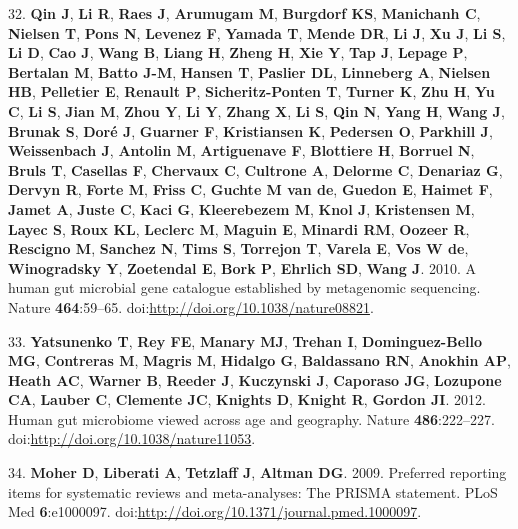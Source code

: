 \documentclass[12pt,]{article}
\begin{document}
32. \textbf{Qin J}, \textbf{Li R}, \textbf{Raes J}, \textbf{Arumugam M},
\textbf{Burgdorf KS}, \textbf{Manichanh C}, \textbf{Nielsen T},
\textbf{Pons N}, \textbf{Levenez F}, \textbf{Yamada T}, \textbf{Mende
DR}, \textbf{Li J}, \textbf{Xu J}, \textbf{Li S}, \textbf{Li D},
\textbf{Cao J}, \textbf{Wang B}, \textbf{Liang H}, \textbf{Zheng H},
\textbf{Xie Y}, \textbf{Tap J}, \textbf{Lepage P}, \textbf{Bertalan M},
\textbf{Batto J-M}, \textbf{Hansen T}, \textbf{Paslier DL},
\textbf{Linneberg A}, \textbf{Nielsen HB}, \textbf{Pelletier E},
\textbf{Renault P}, \textbf{Sicheritz-Ponten T}, \textbf{Turner K},
\textbf{Zhu H}, \textbf{Yu C}, \textbf{Li S}, \textbf{Jian M},
\textbf{Zhou Y}, \textbf{Li Y}, \textbf{Zhang X}, \textbf{Li S},
\textbf{Qin N}, \textbf{Yang H}, \textbf{Wang J}, \textbf{Brunak S},
\textbf{Doré J}, \textbf{Guarner F}, \textbf{Kristiansen K},
\textbf{Pedersen O}, \textbf{Parkhill J}, \textbf{Weissenbach J},
\textbf{Antolin M}, \textbf{Artiguenave F}, \textbf{Blottiere H},
\textbf{Borruel N}, \textbf{Bruls T}, \textbf{Casellas F},
\textbf{Chervaux C}, \textbf{Cultrone A}, \textbf{Delorme C},
\textbf{Denariaz G}, \textbf{Dervyn R}, \textbf{Forte M}, \textbf{Friss
C}, \textbf{Guchte M van de}, \textbf{Guedon E}, \textbf{Haimet F},
\textbf{Jamet A}, \textbf{Juste C}, \textbf{Kaci G}, \textbf{Kleerebezem
M}, \textbf{Knol J}, \textbf{Kristensen M}, \textbf{Layec S},
\textbf{Roux KL}, \textbf{Leclerc M}, \textbf{Maguin E}, \textbf{Minardi
RM}, \textbf{Oozeer R}, \textbf{Rescigno M}, \textbf{Sanchez N},
\textbf{Tims S}, \textbf{Torrejon T}, \textbf{Varela E}, \textbf{Vos W
de}, \textbf{Winogradsky Y}, \textbf{Zoetendal E}, \textbf{Bork P},
\textbf{Ehrlich SD}, \textbf{Wang J}. 2010. A human gut microbial gene
catalogue established by metagenomic sequencing. Nature
\textbf{464}:59--65. doi:\url{http://doi.org/10.1038/nature08821}.

33. \textbf{Yatsunenko T}, \textbf{Rey FE}, \textbf{Manary MJ},
\textbf{Trehan I}, \textbf{Dominguez-Bello MG}, \textbf{Contreras M},
\textbf{Magris M}, \textbf{Hidalgo G}, \textbf{Baldassano RN},
\textbf{Anokhin AP}, \textbf{Heath AC}, \textbf{Warner B},
\textbf{Reeder J}, \textbf{Kuczynski J}, \textbf{Caporaso JG},
\textbf{Lozupone CA}, \textbf{Lauber C}, \textbf{Clemente JC},
\textbf{Knights D}, \textbf{Knight R}, \textbf{Gordon JI}. 2012. Human
gut microbiome viewed across age and geography. Nature
\textbf{486}:222--227. doi:\url{http://doi.org/10.1038/nature11053}.

34. \textbf{Moher D}, \textbf{Liberati A}, \textbf{Tetzlaff J},
\textbf{Altman DG}. 2009. Preferred reporting items for systematic
reviews and meta-analyses: The PRISMA statement. PLoS Med
\textbf{6}:e1000097.
doi:\url{http://doi.org/10.1371/journal.pmed.1000097}.
\end{document}
